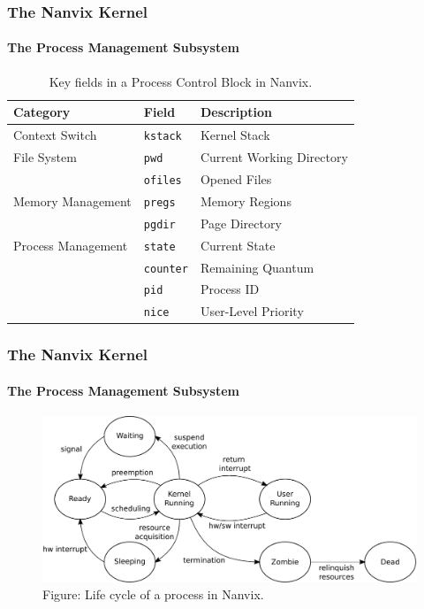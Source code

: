 \documentclass{beamer}
\begin{document}
		\begin{frame}
		\frametitle{The Nanvix Kernel}
		\framesubtitle{The Process Management Subsystem}
			\begin{table}
				\caption{Key fields in a Process Control Block in Nanvix.}
				\begin{tabular}{l l l}
					\toprule
					\textbf{Category}  & \textbf{Field}   & \textbf{Description}      \\
					\midrule
					Context Switch     & \texttt{kstack}  & Kernel Stack              \\[0.4em]
					File System        & \texttt{pwd}     & Current Working Directory \\
					                   & \texttt{ofiles}  & Opened Files              \\[0.4em] 
					Memory Management  & \texttt{pregs}   & Memory Regions            \\ 
					                   & \texttt{pgdir}   & Page Directory            \\[0.4em]
					Process Management & \texttt{state}   & Current State             \\ 
					                   & \texttt{counter} & Remaining Quantum         \\ 
					                   & \texttt{pid}     & Process ID                \\ 
					                   & \texttt{nice}    & User-Level Priority       \\ 
					\bottomrule
				\end{tabular}
			\end{table}
		\end{frame}

		\begin{frame}
		\frametitle{The Nanvix Kernel}
		\framesubtitle{The Process Management Subsystem}
			\begin{figure}
				\centering
				\includegraphics[width=\linewidth]{../../img/nanvix-states}
				\caption{Figure: Life cycle of a process in Nanvix.}
			\end{figure}
		\end{frame}
\end{document}
